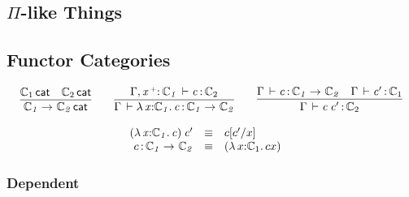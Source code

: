 \documentclass[11pt]{article}
\theoremstyle{plain}
\begin{document}


\subsection{$\Pi$-like Things}

\subsection{Functor Categories}

\[
\begin{array}{c}
\infer{\wfdtp{\arr{\C_1}{\C_2}}}
      {\wfdtp{\C_1} &
        \wfdtp{\C_2}}
\qquad
\infer{\ofdtp{\Gamma}{\lam{x}{\C_1}{c}}{\arr {\C_1} {\C_2}}}
      {\ofdtp{\Gamma,\vptptm{x}{\co}{\C_1}}{c}{\C_2}}
\qquad
\infer{\ofdtp{\Gamma}{\app c {c'}}{\C_2}}
      {\ofdtp{\Gamma}{c}{\arr{\C_1}{\C_2}} &
        \ofdtp{\Gamma}{c'}{\C_1}}
\end{array}
\]

\[
\begin{array}{rcll}
\mathit{({\lambda\,x \mathit{:} \mathbb{C}_1.\,c}) \: c'} & \equiv & c [ c' / x ] \\
c \, \mathit{:} \, \mathit{\mathbb{C}_1}\rightarrow_{\mathit{}} \mathit{\mathbb{C}_2} & \equiv & {({\lambda\,x \mathit{:} \mathbb{C}_1.\,c}{x})} &
\end{array} \\
\]

\subsubsection{Dependent}
\end{document}
